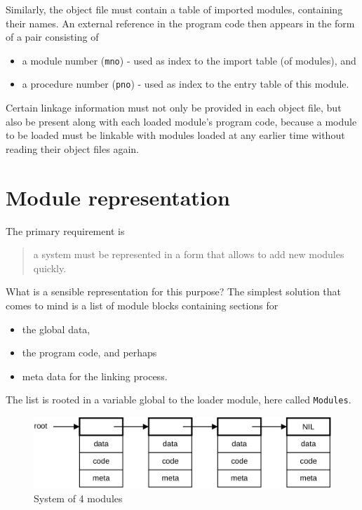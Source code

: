 Similarly, the object file must contain a table of imported modules, containing their names.
An external reference in the program code then appears in the form of a pair consisting of
\begin{itemize}
  \item a module number (\verb|mno|) - used as index to the import table (of modules), and
  \item a procedure number (\verb|pno|) - used as index to the entry table of this module.
\end{itemize}

Certain linkage information must not only be provided in each object file,
but also be present along with each loaded module's program code,
because a module to be loaded must be linkable with modules loaded at any earlier time
without reading their object files again.

\section{Module representation}
The primary requirement is
\begin{quote}
  a system must be represented in a form that allows to add new modules quickly.
\end{quote}
What is a sensible representation for this purpose?
The simplest solution that comes to mind is a list of module blocks containing sections for
\begin{itemize}
  \item the global data,
  \item the program code, and perhaps
  \item meta data for the linking process.
\end{itemize}
The list is rooted in a variable global to the loader module, here called \verb|Modules|.
\begin{figure}[h!]
  \centering
  \includegraphics[width=\textwidth]{i/j}
  \caption{System of 4 modules}
  \label{fig:4modules}
\end{figure}

